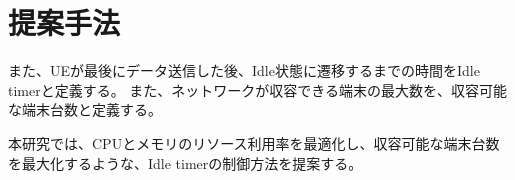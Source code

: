 \documentclass[a4j]{ujarticle}
\begin{document}
%
%
%
%
%
%












\clearpage
\section{提案手法}
また、UEが最後にデータ送信した後、Idle状態に遷移するまでの時間をIdle timerと定義する。
また、ネットワークが収容できる端末の最大数を、収容可能な端末台数と定義する。

本研究では、CPUとメモリのリソース利用率を最適化し、収容可能な端末台数を最大化するような、Idle timerの制御方法を提案する。
\end{document}
